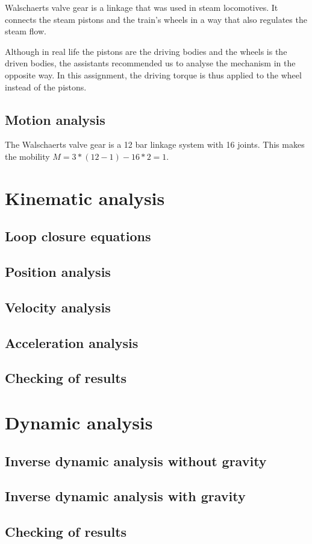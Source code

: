 \documentclass[a4paper]{article}
\begin{document}
Walschaerts valve gear is a linkage that was used in steam locomotives. It connects the steam pistons and the train's wheels in a way that also regulates the steam flow.

Although in real life the pistons are the driving bodies and the wheels is the driven bodies, the assistants recommended us to analyse the mechanism in the opposite way. In this assignment, the driving torque is thus applied to the wheel instead of the pistons.

\subsection{Motion analysis}

The Walschaerts valve gear is a 12 bar linkage system with 16 joints. This makes the mobility \(M=3*(12-1)-16*2=1\).

\section{Kinematic analysis}

\subsection{Loop closure equations}

\subsection{Position analysis}

\subsection{Velocity analysis}

\subsection{Acceleration analysis}

\subsection{Checking of results}

\section{Dynamic analysis}

\subsection{Inverse dynamic analysis without gravity}

\subsection{Inverse dynamic analysis with gravity}

\subsection{Checking of results}



\end{document}
